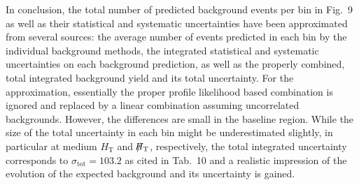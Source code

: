 \documentclass[a4paper]{article}
\newcommand{\HT}{\ensuremath{H_{\text{T}}}\xspace}
\newcommand{\MHT}{\ensuremath{\slash\mkern-12mu{H}_{\text{T}}}\xspace}
\newcommand{\sigmatot}{\ensuremath{\sigma_{\text{tot}}}\xspace}
\begin{document}
In conclusion, the total number of predicted background events per bin in Fig.~9 as well as their statistical and systematic uncertainties have been approximated from several sources: the average number of events predicted in each bin by the individual background methods, the integrated statistical and systematic uncertainties on each background prediction, as well as the properly combined, total integrated background yield and its total uncertainty.
For the approximation, essentially the proper profile likelihood based combination is ignored and replaced by a linear combination assuming uncorrelated backgrounds.
However, the differences are small in the baseline region.
While the size of the total uncertainty in each bin might be underestimated slightly, in particular at medium \HT and \MHT, respectively, the total integrated uncertainty corresponds to \mbox{$\sigmatot=103.2$} as cited in Tab.~10 and a realistic impression of the evolution of the expected background and its uncertainty is gained.
\end{document}
